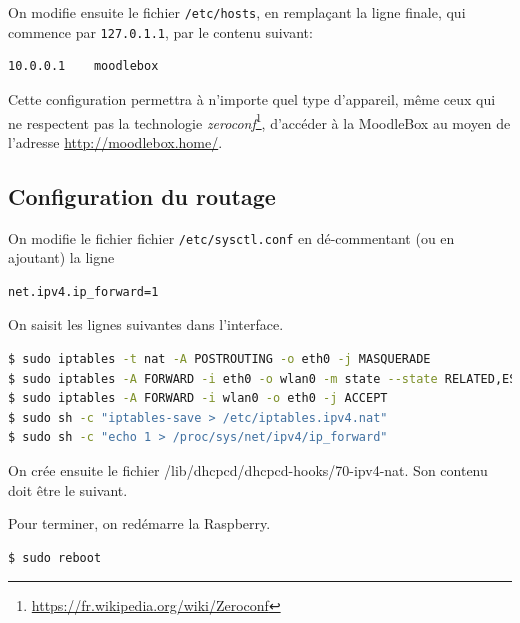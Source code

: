 \documentclass[11pt]{article}
\begin{document}


On modifie ensuite le fichier \lstinline{/etc/hosts}, en remplaçant la ligne finale, qui commence par \lstinline{127.0.1.1}, par le contenu suivant:
\begin{lstlisting}[language=bash]
10.0.0.1	moodlebox
\end{lstlisting}
Cette configuration permettra à n'importe quel type d'appareil, même ceux qui ne respectent pas la technologie \emph{zeroconf}\footnote{\url{https://fr.wikipedia.org/wiki/Zeroconf}}, d'accéder à la MoodleBox au moyen de l'adresse \url{http://moodlebox.home/}.

\subsection{Configuration du routage}

On modifie le fichier fichier \lstinline{/etc/sysctl.conf}
en dé-commentant (ou en ajoutant) la ligne
\begin{lstlisting}[language=bash]
net.ipv4.ip_forward=1
\end{lstlisting}

On saisit les lignes suivantes dans l'interface.

\begin{lstlisting}[language=bash]
$ sudo iptables -t nat -A POSTROUTING -o eth0 -j MASQUERADE
$ sudo iptables -A FORWARD -i eth0 -o wlan0 -m state --state RELATED,ESTABLISHED -j ACCEPT
$ sudo iptables -A FORWARD -i wlan0 -o eth0 -j ACCEPT
$ sudo sh -c "iptables-save > /etc/iptables.ipv4.nat"
$ sudo sh -c "echo 1 > /proc/sys/net/ipv4/ip_forward"
\end{lstlisting}

On crée ensuite le fichier {/lib/dhcpcd/dhcpcd-hooks/70-ipv4-nat}.
Son contenu doit être le suivant.



Pour terminer, on redémarre la Raspberry.

\begin{lstlisting}[language=bash]
$ sudo reboot
\end{lstlisting}
\end{document}
